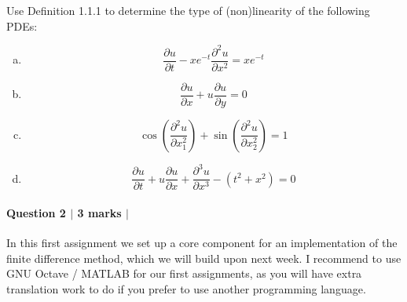 \documentclass[10pt,letterpaper]{scrartcl}
\begin{document}
Use Definition 1.1.1 to determine the type of (non)linearity of the following PDEs:
\begin{enumerate}[(a)]
\item
\begin{minipage}{.5\linewidth}
\begin{equation*}
\frac{\partial u}{\partial t} - xe^{-t} \frac{\partial^2 u}{\partial x^2} = xe^{-t}
\end{equation*}
\end{minipage}
\begin{minipage}{.5\linewidth}
\vspace*{3em}
\hrulefill
\end{minipage}
\item
\begin{minipage}{.5\linewidth}
\begin{equation*}
\frac{\partial u}{\partial x} + u \frac{\partial u}{\partial y} = 0
\end{equation*}
\end{minipage}
\begin{minipage}{.5\linewidth}
\vspace*{3em}
\hrulefill
\end{minipage}
\item
\begin{minipage}{.5\linewidth}
\begin{equation*}
\cos\left(\frac{\partial^2 u}{\partial x_1^2}\right) + \sin\left(\frac{\partial^2 u}{\partial x_2^2}\right) = 1
\end{equation*}
\end{minipage}
\begin{minipage}{.5\linewidth}
\vspace*{3em}
\hrulefill
\end{minipage}
\item
\begin{minipage}{.5\linewidth}
\begin{equation*}
\frac{\partial u}{\partial t} + u \frac{\partial u}{\partial x} + \frac{\partial^3 u}{\partial x^3} - (t^2 + x^2) = 0
\end{equation*}
\end{minipage}
\begin{minipage}{.5\linewidth}
\vspace*{3em}
\hrulefill
\end{minipage}
\end{enumerate}

\paragraph*{Question 2 $\vert$ 3 marks $\vert$ \faFileCodeO}
In this first assignment we set up a core component for an implementation of the finite difference method, which we will build upon next week. I recommend to use \textsf{GNU Octave / MATLAB} for our first assignments, as you will have extra translation work to do if you prefer to use another programming language.
\end{document}
